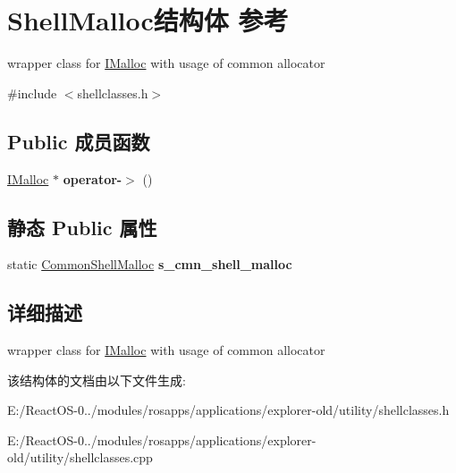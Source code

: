\hypertarget{struct_shell_malloc}{}\section{Shell\+Malloc结构体 参考}
\label{struct_shell_malloc}


wrapper class for \hyperlink{interface_i_malloc}{I\+Malloc} with usage of common allocator  




{\ttfamily \#include $<$shellclasses.\+h$>$}

\subsection*{Public 成员函数}
\begin{DoxyCompactItemize}
\item 
\mbox{\label{struct_shell_malloc_a192e3bff1f91e105cd895385442ae356}} 
\hyperlink{interface_i_malloc}{I\+Malloc} $\ast$ {\bfseries operator-\/$>$} ()
\end{DoxyCompactItemize}
\subsection*{静态 Public 属性}
\begin{DoxyCompactItemize}
\item 
\mbox{\label{struct_shell_malloc_ac7922d3ca9b0bbc1384823dcadaa25ff}} 
static \hyperlink{struct_common_shell_malloc}{Common\+Shell\+Malloc} {\bfseries s\+\_\+cmn\+\_\+shell\+\_\+malloc}
\end{DoxyCompactItemize}


\subsection{详细描述}
wrapper class for \hyperlink{interface_i_malloc}{I\+Malloc} with usage of common allocator 

该结构体的文档由以下文件生成\+:\begin{DoxyCompactItemize}
\item 
E\+:/\+React\+O\+S-\/0../modules/rosapps/applications/explorer-\/old/utility/shellclasses.\+h\item 
E\+:/\+React\+O\+S-\/0../modules/rosapps/applications/explorer-\/old/utility/shellclasses.\+cpp\end{DoxyCompactItemize}
